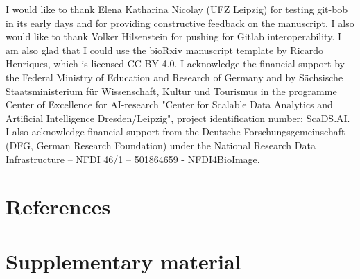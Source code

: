 \documentclass[times, twoside]{zHenriquesLab-StyleBioRxiv}
\begin{document}
\begin{acknowledgements}

I would like to thank Elena Katharina Nicolay (UFZ Leipzig) for testing git-bob in its early days and for providing constructive feedback on the manuscript. I also would like to thank Volker Hilsenstein for pushing for Gitlab interoperability. I am also glad that I could use the bioRxiv manuscript template by Ricardo Henriques, which is licensed CC-BY 4.0. I acknowledge the financial support by the Federal Ministry of Education and Research of Germany and by Sächsische Staatsministerium für Wissenschaft, Kultur und Tourismus in the programme Center of Excellence for AI-research "Center for Scalable Data Analytics and Artificial Intelligence Dresden/Leipzig", project identification number: ScaDS.AI. I also acknowledge financial support from the Deutsche Forschungsgemeinschaft (DFG, German Research Foundation) under the National Research Data Infrastructure – NFDI 46/1 – 501864659 - NFDI4BioImage.

\end{acknowledgements}

\section*{References}


\onecolumn
\newpage





\section*{Supplementary material}
\setcounter{figure}{0} 
\renewcommand{\thefigure}{S\arabic{figure}}
\end{document}
